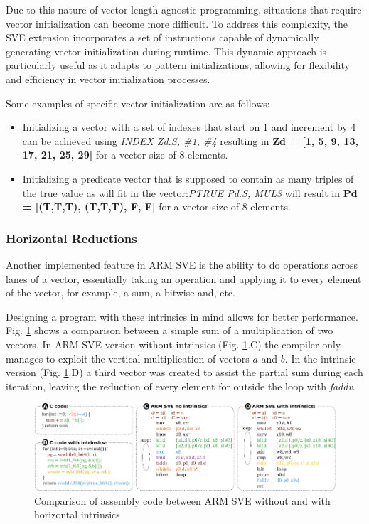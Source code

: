 Due to this nature of vector-length-agnostic programming, situations that require vector initialization can become more difficult. To address this complexity, the SVE extension incorporates a set of instructions capable of dynamically generating vector initialization during runtime. This dynamic approach is particularly useful as it adapts to pattern initializations, allowing for flexibility and efficiency in vector initialization processes.

Some examples of specific vector initialization are as follows:
\begin{itemize}
    \item Initializing a vector with a set of indexes that start on 1 and increment by 4 can be achieved using \textit{INDEX Zd.S, \#1, \#4} resulting in \textbf{Zd = [1, 5, 9, 13, 17, 21, 25, 29]} for a vector size of 8 elements.
    \item Initializing a predicate vector that is supposed to contain as many triples of the true value as will fit in the vector:\textit{PTRUE Pd.S, MUL3} will result in  \textbf{Pd = [(T,T,T), (T,T,T), F, F]} for a vector size of 8 elements.
\end{itemize}

\subsubsection{Horizontal Reductions}

Another implemented feature in ARM SVE is the ability to do operations across lanes of a vector, essentially taking an operation and applying it to every element of the vector, for example, a sum, a bitwise-and, etc. 

Designing a program with these intrinsics in mind allows for better performance. Fig. \ref{fig:horizontal-reductions} shows a comparison between a simple sum of a multiplication of two vectors. In ARM SVE version without intrinsics (Fig. \ref{fig:horizontal-reductions}.C) the compiler only manages to exploit the vertical multiplication of vectors $a$ and $b$. In the intrinsic version (Fig. \ref{fig:horizontal-reductions}.D) a third vector was created to assist the partial sum during each iteration, leaving the reduction of every element for outside the loop with \textit{faddv}.

\begin{figure}[H]
	\begin{center}
 		\includegraphics[width=\linewidth]{images/horizontal-reductions.pdf}
 		\caption{Comparison of assembly code between ARM SVE without and with horizontal intrinsics}
 		\label{fig:horizontal-reductions}
	\end{center} 
\end{figure}

